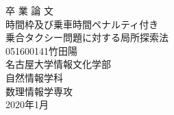 \documentclass[uplatex]{ujreport}
\begin{document}
\begin{table}[b]
\begin{center}
{\huge 卒\hspace{0.1cm} 業\hspace{0.1cm} 論\hspace{0.1cm} 文}\\[2.5cm]
{\huge 時間枠及び乗車時間ペナルティ付き\\乗合タクシー問題に対する局所探索法}\\[6cm]
{\huge 051600141\qquad 竹田陽}\\[1cm]
{\huge 名古屋大学情報文化学部}\\[0.5cm]
{\huge 自然情報学科}\\[0.5cm]
{\huge 数理情報学専攻}\\[0.5cm]
{\huge 2020年1月}\\
\end{center}
\end{table}


\thispagestyle{empty}
\clearpage
\newpage
{}
\setcounter{page}{1}







\thispagestyle{empty}
\tableofcontents
\newpage
\setcounter{page}{1}
\pagestyle{plain}








% 



\end{document}
